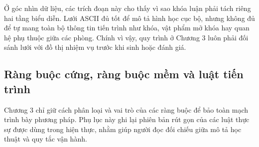 \documentclass[oneside,a4paper,12pt]{extreport}
\begin{document}
Ở góc nhìn dữ liệu, các trích đoạn này cho thấy vì sao khóa luận phải tách riêng hai tầng biểu diễn. Lưới ASCII đủ tốt để mô tả hình học cục bộ, nhưng không đủ để tự mang toàn bộ thông tin tiến trình như khóa, vật phẩm mở khóa hay quan hệ phụ thuộc giữa các phòng. Chính vì vậy, quy trình ở Chương 3 luôn phải đối sánh lưới với đồ thị nhiệm vụ trước khi sinh hoặc đánh giá.

\subsection{Ràng buộc cứng, ràng buộc mềm và luật tiến trình}
Chương 3 chỉ giữ cách phân loại và vai trò của các ràng buộc để bảo toàn mạch trình bày phương pháp. Phụ lục này ghi lại phiên bản rút gọn của các luật thực sự được dùng trong hiện thực, nhằm giúp người đọc đối chiếu giữa mô tả học thuật và quy tắc vận hành.
\end{document}
